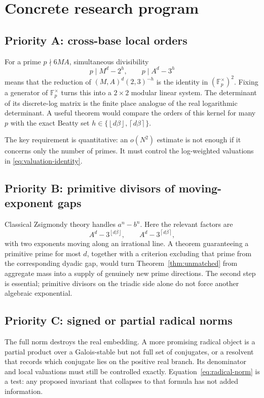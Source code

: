 \documentclass[11pt,oneside]{article}
\theoremstyle{definition}
\theoremstyle{remark}
\newcommand{\floor}[1]{\left\lfloor #1\right\rfloor}
\newcommand{\ceil}[1]{\left\lceil #1\right\rceil}
\begin{document}
\section{Concrete research program}
\label{sec:program}

\subsection{Priority A: cross-base local orders}

For a prime $p\nmid6MA$, simultaneous divisibility
\[
 p\mid M^d-2^h,
 \qquad
 p\mid A^d-3^h
\]
means that the reduction of $(M,A)^d(2,3)^{-h}$ is the identity in
$(\mathbb F_p^\times)^2$.  Fixing a generator of $\mathbb F_p^\times$ turns this into a
$2\times2$ modular linear system.  The determinant of its discrete-log matrix is the finite
place analogue of the real logarithmic determinant.  A useful theorem would compare the
orders of this kernel for many $p$ with the exact Beatty set
$h\in\{\floor{d\beta},\ceil{d\beta}\}$.

The key requirement is quantitative: an $o(N^2)$ estimate is not enough if it concerns only the
number of primes.  It must control the log-weighted valuations in
\eqref{eq:valuation-identity}.

\subsection{Priority B: primitive divisors of moving-exponent gaps}

Classical Zsigmondy theory handles $a^n-b^n$.  Here the relevant factors are
\[
 A^d-3^{\floor{d\beta}},\qquad
 A^d-3^{\ceil{d\beta}},
\]
with two exponents moving along an irrational line.  A theorem guaranteeing a primitive prime
for most $d$, together with a criterion excluding that prime from the corresponding dyadic
gap, would turn Theorem~\ref{thm:unmatched} from aggregate mass into a supply of genuinely new
prime directions.  The second step is essential; primitive divisors on the triadic side alone
do not force another algebraic exponential.

\subsection{Priority C: signed or partial radical norms}

The full norm destroys the real embedding.  A more promising radical object is a partial
product over a Galois-stable but not full set of conjugates, or a resolvent that records which
conjugate lies on the positive real branch.  Its denominator and local valuations must still be
controlled exactly.  Equation~\eqref{eq:radical-norm} is a test: any proposed invariant that
collapses to that formula has not added information.
\end{document}
